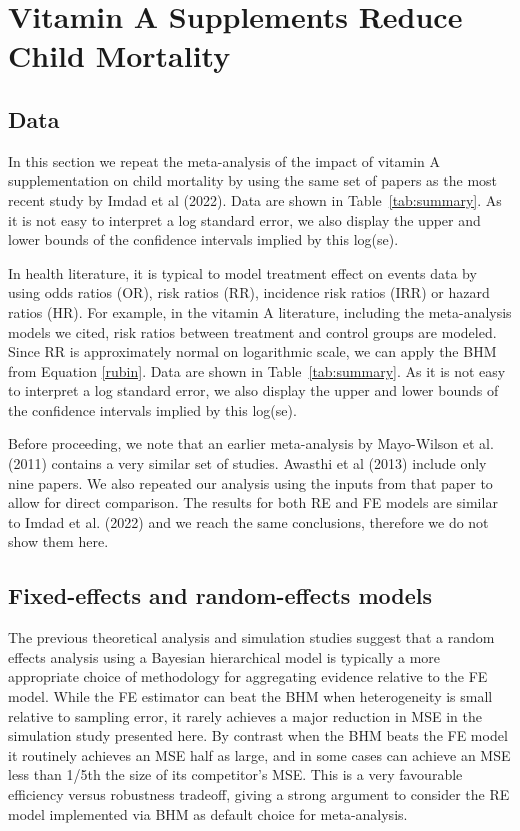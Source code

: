 \documentclass[12pt]{article}
\begin{document}
\section{Vitamin A Supplements Reduce Child Mortality}

\subsection{Data}

In this section we repeat the meta-analysis of the impact of vitamin A supplementation on child mortality by using the same set of papers as the most recent study by Imdad et al (2022). Data are shown in Table~\ref{tab:summary}. 
As it is not easy to interpret a log standard error, we also display the upper and lower bounds of the confidence intervals implied by this log(se). 



In health literature, it is typical to model treatment effect on events data by using odds ratios (OR), risk ratios (RR), incidence risk ratios (IRR) or hazard ratios (HR). For example, in the vitamin A literature, including the meta-analysis models we cited, risk ratios between treatment and control groups are modeled. Since RR is approximately normal on logarithmic scale, we can apply the BHM from Equation \eqref{rubin}. Data are shown in Table~\ref{tab:summary}. As it is not easy to interpret a log standard error, we also display the upper and lower bounds of the confidence intervals implied by this log(se).


Before proceeding, we note that an earlier meta-analysis by Mayo-Wilson et al. (2011) contains a very similar set of studies. Awasthi et al (2013) include only nine papers. We also repeated our analysis using the inputs from that paper to allow for direct comparison. The results for both RE and FE models are similar to Imdad et al. (2022) and we reach the same conclusions, therefore we do not show them here.


\subsection{Fixed-effects and random-effects models}

The previous theoretical analysis and simulation studies suggest that a random effects analysis using a Bayesian hierarchical model is typically a more appropriate choice of methodology for aggregating evidence relative to the FE model. While the FE estimator can beat the BHM when heterogeneity is small relative to sampling error, it rarely achieves a major reduction in MSE in the simulation study presented here. By contrast when the BHM beats the FE model it routinely achieves an MSE half as large, and in some cases can achieve an MSE less than 1/5th the size of its competitor's MSE. This is a very favourable efficiency versus robustness tradeoff, giving a strong argument to consider the RE model implemented via BHM as default choice for meta-analysis. 
\end{document}
